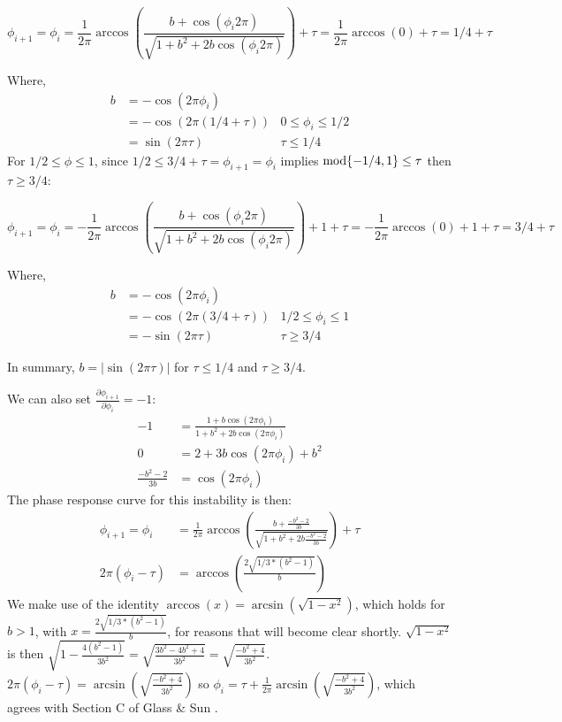 \begin{equation}
    \phi_{i+1} = \phi_i = \frac{1}{2\pi}\arccos(\frac{b+\cos(\phi_i 2\pi)}{\sqrt{1+b^2+2b\cos(\phi_i 2\pi)}}) + \tau = \frac{1}{2\pi}\arccos(0) + \tau = 1/4 +\tau
\end{equation}

\noindent Where,
\begin{align}
    b&= -\cos(2\pi \phi_i) \nonumber \\
    &= -\cos(2\pi(1/4 +\tau)) & 0 \leq \phi_i \leq 1/2 \nonumber \\
    &= \sin(2\pi\tau) & \tau \leq 1/4
\end{align} 
For $1/2 \leq \phi \leq 1$, since $1/2 \leq 3/4 + \tau = \phi_{i+1} = \phi_i $ implies $ \textnormal{mod} \{-1/4,1\} \leq \tau $ then $ \tau \geq 3/4$:

\begin{equation}
    \phi_{i+1} = \phi_i = -\frac{1}{2\pi}\arccos(\frac{b+\cos(\phi_i 2\pi)}{\sqrt{1+b^2+2b\cos(\phi_i 2\pi)}}) + 1 + \tau = -\frac{1}{2\pi}\arccos(0) + 1 + \tau = 3/4 +\tau
\end{equation}

\noindent Where,
\begin{align}
b&= -\cos(2\pi \phi_i) \nonumber \\
&= -\cos(2\pi(3/4 +\tau)) & 1/2 \leq \phi_i \leq 1 \nonumber \\
&= -\sin(2\pi\tau) & \tau \geq 3/4
\end{align}

\noindent In summary, $b = |\sin(2\pi\tau)|$ for $\tau \leq 1/4$ and $\tau \geq 3/4$.

\noindent We can also set $\frac{\partial \phi_{i+1}}{\partial \phi_i} = -1$:
\begin{align}
    -1 &= \frac{1+b\cos(2\pi \phi_i)}{1 + b^2 + 2b\cos(2\pi \phi_i)} \nonumber \\
    0 &= 2+3b\cos(2\pi \phi_i) + b^2 \nonumber \\
    \frac{-b^2-2}{3b} &= \cos(2\pi \phi_i)
    \label{eq:square} 
\end{align}
The phase response curve for this instability is then:
\begin{align}
    \phi_{i+1} = \phi_i &= \frac{1}{2\pi}\arccos(\frac{b+\frac{-b^2-2}{3b}}{\sqrt{1+b^2+2b\frac{-b^2-2}{3b}}}) + \tau \nonumber \\
    2\pi(\phi_i - \tau) &= \arccos(\frac{2\sqrt{1/3*(b^2-1)}}{b})
\end{align} 
We make use of the identity $\arccos(x) = \arcsin(\sqrt{1-x^2})$, which holds for $b>1$, with $x = \frac{2\sqrt{1/3*(b^2-1)}}{b}$, for reasons that will become clear shortly. $\sqrt{1-x^2}$ is then $\sqrt{1-\frac{4(b^2-1)}{3b^2}} = \sqrt{\frac{3b^2-4b^2+4}{3b^2}} = \sqrt{\frac{-b^2+4}{3b^2}}$. $2\pi(\phi_i - \tau) = \arcsin(\sqrt{\frac{-b^2+4}{3b^2}})$ so $\phi_i = \tau +\frac{1}{2\pi}\arcsin(\sqrt{\frac{-b^2+4}{3b^2}})$, which agrees with Section C of Glass \& Sun \supercite{GLASS1994}.

